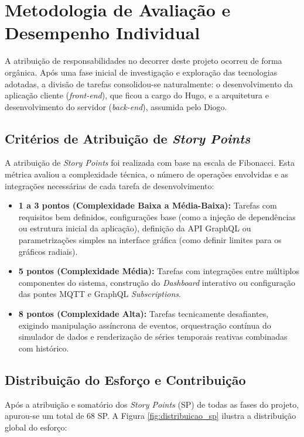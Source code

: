 \section{Metodologia de Avaliação e Desempenho Individual} \label{sec:desempenho_individual}

A atribuição de responsabilidades no decorrer deste projeto ocorreu de forma orgânica. Após uma fase inicial de investigação e exploração das tecnologias adotadas, a divisão de tarefas consolidou-se naturalmente: o desenvolvimento da aplicação cliente (\textit{front-end}), que ficou a cargo do Hugo, e a arquitetura e desenvolvimento do servidor (\textit{back-end}), assumida pelo Diogo. 

\subsection{Critérios de Atribuição de \textit{Story Points}}
A atribuição de \textit{Story Points} foi realizada com base na escala de Fibonacci. Esta métrica avaliou a complexidade técnica, o número de operações envolvidas e as integrações necessárias de cada tarefa de desenvolvimento:
\begin{itemize}
	\item \textbf{1 a 3 pontos (Complexidade Baixa a Média-Baixa):} Tarefas com requisitos bem definidos, configurações base (como a injeção de dependências ou estrutura inicial da aplicação), definição da API GraphQL ou parametrizações simples na interface gráfica (como definir limites para os gráficos radiais).
	\item \textbf{5 pontos (Complexidade Média):} Tarefas com integrações entre múltiplos componentes do sistema, construção do \textit{Dashboard} interativo ou configuração das pontes MQTT e GraphQL \textit{Subscriptions}.
	\item \textbf{8 pontos (Complexidade Alta):} Tarefas tecnicamente desafiantes, exigindo manipulação assíncrona de eventos, orquestração contínua do simulador de dados e renderização de séries temporais reativas combinadas com histórico.
\end{itemize}

\subsection{Distribuição do Esforço e Contribuição}
Após a atribuição e somatório dos \textit{Story Points} (SP) de todas as fases do projeto, apurou-se um total de 68 SP. A Figura \ref{fig:distribuicao_sp} ilustra a distribuição global do esforço:

